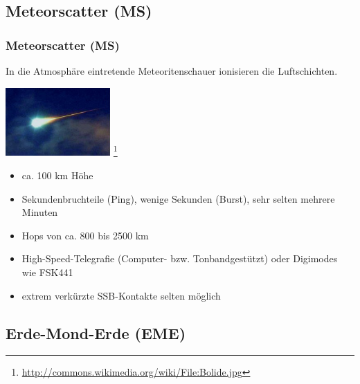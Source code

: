 \subsection[Meteorscatter]{Meteorscatter (MS)}

\begin{frame}
    \frametitle{Meteorscatter (MS)}

    In die Atmosphäre eintretende Meteoritenschauer ionisieren die
    Luftschichten.

    \begin{center}
        \includegraphics[width=0.3\textwidth,height=.3\textheight,keepaspectratio]{bv11/Bolide.jpg}
        \footnote{\tiny \url{http://commons.wikimedia.org/wiki/File:Bolide.jpg}}
    \end{center}

    \begin{itemize}
        \item ca. 100 km Höhe
        \item Sekundenbruchteile (Ping), wenige Sekunden (Burst), sehr selten
              mehrere Minuten
        \item Hops von ca. 800 bis 2500 km
        \item High-Speed-Telegrafie (Computer- bzw. Tonbandgestützt) oder Digimodes wie FSK441
        \item extrem verkürzte SSB-Kontakte selten möglich
    \end{itemize}


\end{frame}

\subsection[EME]{Erde-Mond-Erde (EME)}


